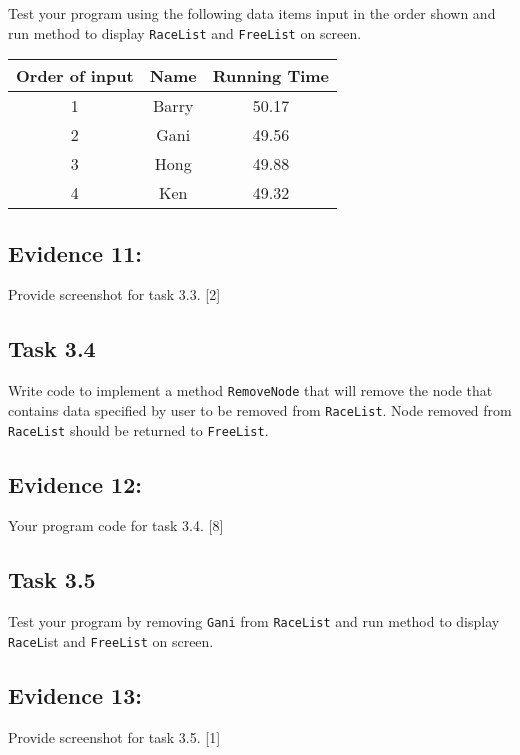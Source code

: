 \documentclass{article}
\begin{document}
Test your program using the following data items input in the order
shown and run method to display \texttt{RaceList} and \texttt{FreeList}
on screen. 
\noindent \begin{center}
\begin{tabular}{|c|c|c|}
\hline 
\textbf{Order of input } & \textbf{Name} & \textbf{Running Time}\tabularnewline
\hline 
\hline 
1 & Barry & 50.17\tabularnewline
\hline 
2 & Gani  & 49.56\tabularnewline
\hline 
3 & Hong & 49.88\tabularnewline
\hline 
4 & Ken & 49.32 \tabularnewline
\hline 
\end{tabular} 
\par\end{center}

\subsection*{Evidence 11: }

Provide screenshot for task 3.3. \hfill{} {[}2{]}

\subsection*{Task 3.4 }

Write code to implement a method \texttt{RemoveNode} that will remove
the node that contains data specified by user to be removed from \texttt{RaceList}.
Node removed from \texttt{RaceList} should be returned to \texttt{FreeList}. 

\subsection*{Evidence 12: }

Your program code for task 3.4. \hfill{}{[}8{]}

\subsection*{Task 3.5 }

Test your program by removing \texttt{Gani} from \texttt{RaceList}
and run method to display \texttt{RaceL}ist and \texttt{FreeList}
on screen. 

\subsection*{Evidence 13: }

Provide screenshot for task 3.5. \hfill{} {[}1{]}
\end{document}
